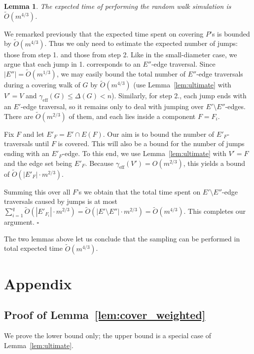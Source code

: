 \documentclass[11pt, letterpaper]{article}
\newtheorem{lemma}[theorem]{Lemma}
\newenvironment{proof}{\noindent{\bf Proof:}\hspace*{1em}}{\qed\bigskip}
\newcommand{\qed}{\hfill\ensuremath{\square}}
\newcommand{\tO}{\widetilde{O}}
\newcommand{\diameff}{\gamma_{\mathrm{eff}}}
\newcommand{\diamdist}{\Delta}
\begin{document}
\begin{lemma}\label{lem:walking_cost_general}
The expected time of performing the random walk simulation is $\tO(m^{4/3})$.
\end{lemma}
\begin{proof}
We remarked previously that the expected time spent on covering $P$'s is bounded by $\tO(m^{4/3})$. Thus we only need to estimate the expected number of jumps: those from step 1. and those from step 2. Like in the small-diameter case, we argue that each jump in 1. corresponds to an $E''$-edge traversal. Since $|E''|=\tO(m^{1/3})$, we may easily bound the total number of $E''$-edge traversals during a covering walk of $G$ by $\tO(m^{4/3})$ (use Lemma~\ref{lem:ultimate} with $V' = V$ and $\diameff(G) \le \diamdist(G) < n$). Similarly, for step 2., each jump ends with an $E'$-edge traversal, so it remains only to deal with jumping over $E'\setminus E''$-edges. There are $\tO(m^{2/3})$ of them, and each lies inside a component $F = F_i$.

Fix $F$ and let $E'_F = E' \cap E(F)$. Our aim is to bound the number of $E'_F$-traversals until $F$ is covered. This will also be a bound for the number of jumps ending with an $E'_F$-edge. To this end, we use Lemma~\ref{lem:ultimate} with $V' = F$ and the edge set being $E'_F$. Because $\diameff(V') = O(m^{2/3})$, this yields a bound of $\tO(|E'_F|\cdot m^{2/3})$.

Summing this over all $F$'s we obtain that the total time spent on $E'\setminus E''$-edge traversals caused by jumps is at most $\sum_{i=1}^{q}\tO(|E'_{F_i}| \cdot m^{2/3})=\tO(|E'\setminus E''| \cdot m^{2/3})=\tO(m^{4/3})$. This completes our argument. 
\end{proof}

The two lemmas above let us conclude that the sampling can be performed in total expected time $\tO(m^{4/3})$. 

\appendix
\section{Appendix}

\subsection{Proof of Lemma~\ref{lem:cover_weighted}}\label{app:cover_weighted}

We prove the lower bound only; the upper bound is a special case of Lemma~\ref{lem:ultimate}.
\end{document}
